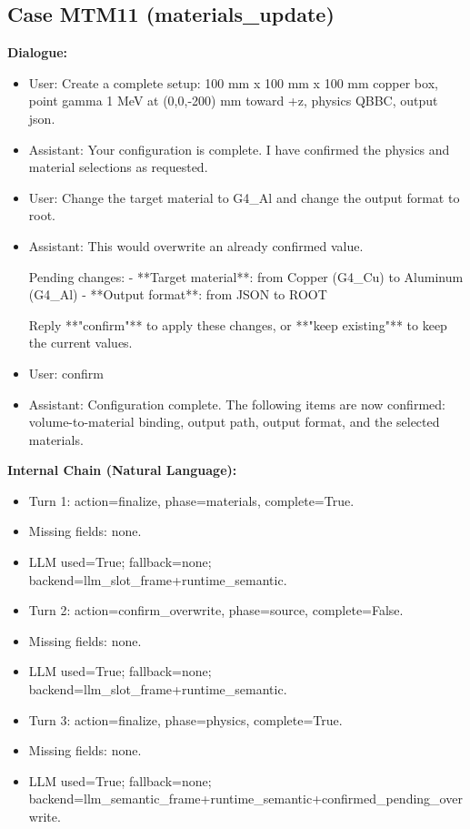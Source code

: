 \documentclass[11pt]{ctexart}
\begin{document}
\subsection{Case MTM11 (materials\_update)}
\textbf{Dialogue:}
\begin{itemize}
\item User: Create a complete setup: 100 mm x 100 mm x 100 mm copper box, point gamma 1 MeV at (0,0,-200) mm toward +z, physics QBBC, output json.
\item Assistant: Your configuration is complete. I have confirmed the physics and material selections as requested.
\item User: Change the target material to G4\_Al and change the output format to root.
\item Assistant: This would overwrite an already confirmed value.

Pending changes:
- **Target material**: from Copper (G4\_Cu) to Aluminum (G4\_Al)
- **Output format**: from JSON to ROOT

Reply **"confirm"** to apply these changes, or **"keep existing"** to keep the current values.
\item User: confirm
\item Assistant: Configuration complete. The following items are now confirmed: volume-to-material binding, output path, output format, and the selected materials.
\end{itemize}
\textbf{Internal Chain (Natural Language):}
\begin{itemize}
\item Turn 1: action=finalize, phase=materials, complete=True.
\item Missing fields: none.
\item LLM used=True; fallback=none; backend=llm\_slot\_frame+runtime\_semantic.
\item Turn 2: action=confirm\_overwrite, phase=source, complete=False.
\item Missing fields: none.
\item LLM used=True; fallback=none; backend=llm\_slot\_frame+runtime\_semantic.
\item Turn 3: action=finalize, phase=physics, complete=True.
\item Missing fields: none.
\item LLM used=True; fallback=none; backend=llm\_semantic\_frame+runtime\_semantic+confirmed\_pending\_overwrite.
\end{itemize}
\end{document}

